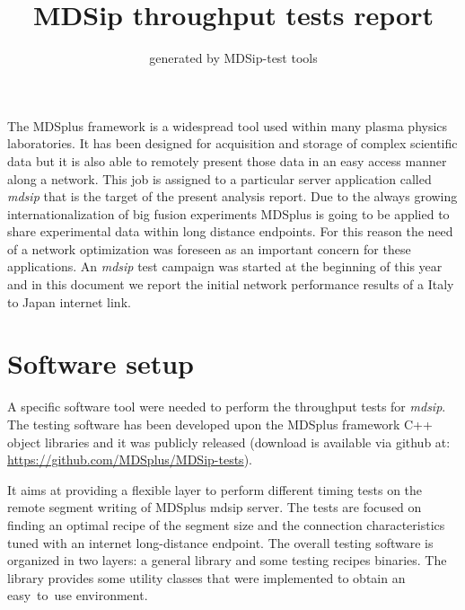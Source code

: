 \documentclass[10pt,a4paper]{article}
\author{generated by MDSip-test tools}
\title{MDSip throughput tests report}
\begin{document}
\maketitle

The MDSplus framework is a widespread tool used within many plasma physics laboratories.
It has been designed for acquisition and storage of complex scientific data but it is also able to remotely present those data in an easy access manner along a network.
This job is assigned to a particular server application called \emph{mdsip} that is the target of the present analysis report.
Due to the always growing internationalization of big fusion experiments MDSplus is going to be applied to share experimental data within long distance endpoints.
For this reason the need of a network optimization was foreseen as an important concern for these applications.
An \emph{mdsip} test campaign was started at the beginning of this year and in this document we report the initial network performance results of a Italy to Japan internet link.

\section{Software setup}

A specific software tool were needed to perform the throughput tests for \emph{mdsip}.
The testing software has been developed upon the MDSplus framework C++ object libraries and it was publicly released (download is available via github at: \url{https://github.com/MDSplus/MDSip-tests}).

It aims at providing a flexible layer to perform different timing tests on the remote segment writing of MDSplus mdsip server. 
The tests are focused on finding an optimal recipe of the segment size and the connection characteristics tuned with an internet long-distance endpoint.
The overall testing software is organized in two layers: a general library and some testing recipes binaries. 
The library provides some utility classes that were implemented to obtain an easy~to~use environment.  
\end{document}
